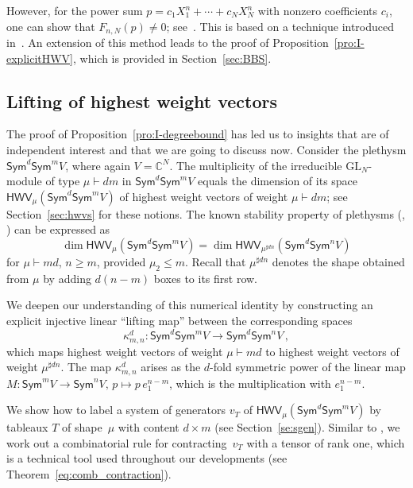 \documentclass[11pt]{amsart}
\def\C{\mathbb{C}}
\def\GL{\mathrm{GL}}
\def\Sym{\mathsf{Sym}}
\newcommand{\HWV}{\mathsf{HWV}}
\numberwithin{equation}{section}
\begin{document}
However, for the power sum 
$p=c_1 X_1^n +\cdots + c_N X_N^n$ with nonzero coefficients $c_i$,  
one can show that $F_{n,N}(p) \ne 0$; see\ \cite[Thm.~3.19]{buik:15}. 
This is based on a technique introduced in~\cite{bci:10}. 
An extension of this method leads to the proof of Proposition~\ref{pro:I-explicitHWV}, 
which is provided in Section~\ref{sec:BBS}.


\subsection{Lifting of highest weight vectors}\label{subs:hwv-lift} 

The proof of Proposition~\ref{pro:I-degreebound} 
has led us to insights that are of independent interest and that we 
are going to discuss now. 
Consider the plethysm $\Sym^d \Sym^mV$, where again $V=\C^N$.  
The multiplicity of the irreducible $\GL_N$-module of type $\mu\vdash dm$ 
in $\Sym^d \Sym^m V$ equals the dimension of its space 
$\HWV_{\mu}(\Sym^d \Sym^m V)$ of highest weight vectors of weight $\mu\vdash dm$; 
see Section~\ref{sec:hwvs} for these notions. 
The known stability property of plethysms (\cite[Cor.~1.8]{wei:90}, \cite{carre-thibon:92}) 
can be expressed as 
$$
 \dim \HWV_{\mu}(\Sym^d \Sym^mV) = \dim \HWV_{\mu^{\sharp dn}}(\Sym^d \Sym^{n} V) 
$$
for $\mu\vdash md$, $n\ge m$, provided $\mu_2\le m$. 
Recall that $\mu^{\sharp dn}$ denotes the shape obtained from $\mu$ by 
adding $d(n-m)$ boxes to its first row.

We deepen our understanding of this numerical identity by 
constructing an explicit injective linear ``lifting map''  
between the corresponding spaces 
\begin{equation}\label{eq:lift}
  \kappa^d_{m,n}\colon\Sym^d \Sym^m V \to \Sym^d \Sym^{n} V \, , 
\end{equation}
which maps highest weight vectors of weight $\mu\vdash md$ to 
highest weight vectors of weight $\mu^{\sharp dn}$. 
The map $\kappa^d_{m,n}$ arises as the $d$-fold symmetric power of the linear map 
$M\colon\Sym^m V \to \Sym^{n} V,\, p\mapsto p\, e_1^{n-m}$, 
which is the multiplication with $e_1^{n-m}$. 


We show how to label a system of generators $v_T$ of $\HWV_{\mu}(\Sym^d \Sym^m V)$ 
by tableaux $T$ of shape~$\mu$ with content $d\times m$ (see Section~\ref{se:sgen}). 
Similar to \cite{bci:10,ike:12b},  we work out a combinatorial rule for contracting~$v_T$ with a tensor of rank one,
which is a technical tool used throughout our developments (see Theorem~\ref{eq:comb_contraction}).  
\end{document}
